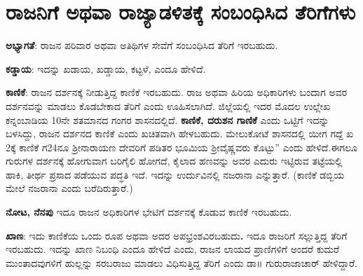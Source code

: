 \vskip 5pt

\section{ರಾಜನಿಗೆ ಅಥವಾ ರಾಜ್ಯಾಡಳಿತಕ್ಕೆ ಸಂಬಂಧಿಸಿದ ತೆರಿಗೆಗಳು}

\textbf{ಅಭ್ಯಾಗತೆ}: ರಾಜನ ಪರಿವಾರ ಅಥವಾ ಅತಿಥಿಗಳ ಸೇವೆಗೆ ಸಂಬಂಧಿಸಿದ ತೆರಿಗೆ ಇರಬಹುದು.

\vskip 3pt

\textbf{ಕಡ್ಡಾಯ}: ಇದನ್ನು ಖಡಾಯ, ಖಡ್ಡಾಯ, ಕಟ್ಟಳೆ, ಎಂದೂ ಹೇಳಿದೆ.

\vskip 3pt

\textbf{ಕಾಣಿಕೆ}: ರಾಜನ ದರ್ಶನಕ್ಕೆ ನೀಡುತ್ತಿದ್ದ ಕಾಣಿಕೆ ಇರಬಹುದು. ರಾಜ ಅಥವಾ ಹಿರಿಯ ಅಧಿಕಾರಿಗಳು ಬಂದಾಗ ಅವರ ದರ್ಶನವನ್ನು ಮಾಡಲು ಕೊಡಬೇಕಾದ ತೆರಿಗೆ ಎಂದು ಊಹಿಸಲಾಗಿದೆ. ಜಿಲ್ಲೆಯಲ್ಲಿ ಇದರ ಮೊದಲ ಉಲ್ಲೇಖ ಕನ್ನಂಬಾಡಿಯ 10ನೇ ಶತಮಾನದ ಗಂಗರ ಶಾಸನದಲ್ಲಿದೆ. \textbf{ಕಾಣಿಕೆ, ದರುಶನ ಗಾಣಿಕೆ} ಎಂದು ಒಟ್ಟಿಗೆ ಇದನ್ನು ಬಳಸಿದ್ದು, ರಾಜನ ದರ್ಶನದ ಕಾಣಿಕೆ ಎಂದು ಖಚಿತವಾಗಿ ಹೇಳಬಹುದು. ಮೇಲುಕೋಟೆ ಶಾಸನದಲ್ಲಿ ಯೀಗ ಗದ್ದೆ ಖ 2ಕ್ಕೆ ಕಾಣಿಕೆ ಗ24ನೂ ಶ‍್ರೀನಾರಾಯಣ ದೇವರಿಗೆ ಪಡಿತರ ಭೂಮಿಯ ಶ‍್ರೀವೈಷ್ಣವರು ಕೊಟ್ಟು” ಎಂದು ಹೇಳಿದೆ.ಈಗಲೂ ಗುರುಗಳ ದರ್ಶನಕ್ಕೆ ಹೋಗುವಾಗ ಬರಿಗೈಲಿ ಹೋಗದೆ, ಕೈಲಾದ ಹಣವನ್ನು ಅವರ ಎದುರು ಇಟ್ಟಿರುವ ತಟ್ಟೆಯಲ್ಲಿ ಹಾಕಿ, ತೀರ್ಥ ಪ್ರಸಾದ ಪಡೆಯುವ ಪದ್ಧತಿ ಇದೆ. ಇದನ್ನು ಉರ್ದುವಿನಲ್ಲಿ ನಜರಾನಾ ಎನ್ನುತ್ತಾರೆ. (ಕಾಣಿಕೆ ಡಬ್ಬಿಯ ಮೇಲೆ ನಜರಾನಾ ಎಂದು ಬರೆದಿರುತ್ತಾರೆ.)

\vskip 3pt

\textbf{ನೋಟ, ನೆನಪು} ಇದೂ ರಾಜನ ಅಧಿಕಾರಿಗಳ ಭೇಟಿಗೆ ದರ್ಶನಕ್ಕೆ ಕೊಡುವ ಕಾಣಿಕೆ ಇರಬಹುದು.

\vskip 3pt

\textbf{ಖಾಣ}: ಇದು ಕಾಣಿಕೆಯ ಒಂದು ರೂಪ ಅಥವಾ ಅದರ ಅಪಭ್ರಂಶವಿರಬಹುದು\textbf{. }ಇದೂ ರಾಜರಿಗೆ ಸಲ್ಲುತ್ತಿದ್ದ ತೆರಿಗೆ ಇರಬಹುದು. ಇದನ್ನು ಖಾಣ ನಿಬಂಧಿ ಎಂದೂ ಹೇಳಿದೆ ಎಂದು, ರಾಜನ ಲಾಯದ ಪ್ರಾಣಿಗಳಿಗೆ ಅಂದರೆ ಕುದುರೆ ಮುಂತಾದವುಗಳಿಗೆ ಹುಲ್ಲನ್ನು ಸರಬರಾಜು ಮಾಡಲು ವಿಧಿಸುತ್ತಿದ್ದ ತೆರಿಗೆ ಎಂದು ಡಾ॥ ಗುರುರಾಜಾಚಾರ್​ ಹೇಳಿದ್ದಾರೆ.

